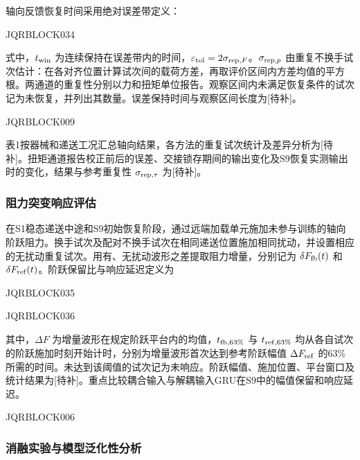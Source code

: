 轴向反馈恢复时间采用绝对误差带定义：


JQRBLOCK034


式中，$t_{\rm win}$ 为连续保持在误差带内的时间，$\varepsilon_{\rm tol}=2\sigma_{{\rm rep},F}$。$\sigma_{{\rm rep},p}$ 由重复不换手试次估计：在各对齐位置计算试次间的载荷方差，再取评价区间内方差均值的平方根。两通道的重复性分别以力和扭矩单位报告。观察区间内未满足恢复条件的试次记为未恢复，并列出其数量。误差保持时间与观察区间长度为[待补]。







JQRBLOCK009







表1按器械和递送工况汇总轴向结果，各方法的重复试次统计及差异分析为[待补]。扭矩通道报告校正前后的误差、交接锁存期间的输出变化及S9恢复实测输出时的变化，结果与参考重复性 $\sigma_{{\rm rep},\tau}$ 为[待补]。




\subsubsection{阻力突变响应评估}


在S1稳态递送中途和S9初始恢复阶段，通过远端加载单元施加未参与训练的轴向阶跃阻力。换手试次及配对不换手试次在相同递送位置施加相同扰动，并设置相应的无扰动重复试次。用有、无扰动波形之差提取阻力增量，分别记为 $\delta F_{\rm fb}(t)$ 和 $\delta F_{\rm ref}(t)$。阶跃保留比与响应延迟定义为


JQRBLOCK035



JQRBLOCK036


其中，$\Delta F$ 为增量波形在规定阶跃平台内的均值，$t_{{\rm fb},63\%}$ 与 $t_{{\rm ref},63\%}$ 均从各自试次的阶跃施加时刻开始计时，分别为增量波形首次达到参考阶跃幅值 $\Delta F_{\rm ref}$ 的63\%所需的时间。未达到该阈值的试次记为未响应。阶跃幅值、施加位置、平台窗口及统计结果为[待补]。重点比较耦合输入与解耦输入GRU在S9中的幅值保留和响应延迟。







JQRBLOCK006






\subsubsection{消融实验与模型泛化性分析}


